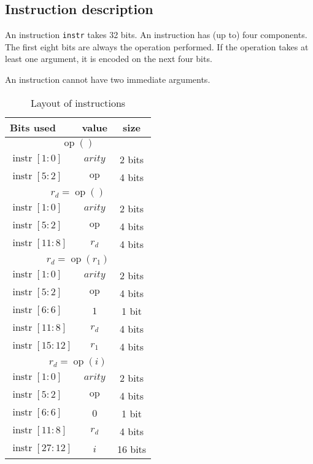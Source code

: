 \documentclass{scrartcl}
\DeclareMathOperator{\op}{op}
\DeclareMathOperator{\instr}{instr}
\begin{document}
\subsection*{Instruction description}
An instruction \verb|instr| takes 32 bits. An instruction has (up to) four
components. The first eight bits are always the operation performed. If the
operation takes at least one argument, it is encoded on the next four bits.\par
An instruction cannot have two immediate arguments.
\begin{table}[h]
  \caption{Layout of instructions}
  \begin{minipage}{0.5\textwidth}
    \begin{tabular}{lcc}
      \toprule
      \textbf{Bits used} & \textbf{value} & \textbf{size}\\
      \midrule
      \multicolumn{3}{c}{\(\op()\)}\\
      \(\instr[1:0]\) & \(arity\) & 2 bits\\
      \(\instr[5:2]\) & \(\op\) & 4 bits\\
      \midrule
      \multicolumn{3}{c}{\(r_d = \op()\)}\\
      \(\instr[1:0]\) & \(arity\) & 2 bits\\
      \(\instr[5:2]\) & \(\op\) & 4 bits\\
      \(\instr[11:8]\) & \(r_d\) & 4 bits\\
      \midrule
      \multicolumn{3}{c}{\(r_d = \op(r_1)\)}\\
      \(\instr[1:0]\) & \(arity\) & 2 bits\\
      \(\instr[5:2]\) & \(\op\) & 4 bits\\
      \(\instr[6:6]\) & \(1\) & 1 bit\\
      \(\instr[11:8]\) & \(r_d\) & 4 bits\\
      \(\instr[15:12]\) & \(r_1\) & 4 bits\\
      \midrule
      \multicolumn{3}{c}{\(r_d = \op(i)\)}\\
      \(\instr[1:0]\) & \(arity\) & 2 bits\\
      \(\instr[5:2]\) & \(\op\) & 4 bits\\
      \(\instr[6:6]\) & \(0\) & 1 bit\\
      \(\instr[11:8]\) & \(r_d\) & 4 bits\\
      \(\instr[27:12]\) & \(i\) & 16 bits\\
      \bottomrule
    \end{tabular}
  \end{minipage}

\end{table}
\end{document}
